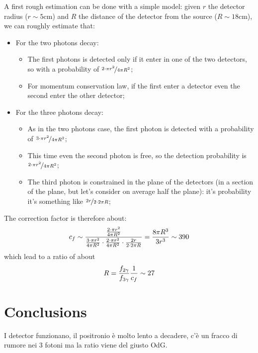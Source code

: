 \documentclass[11pt,a4 paper]{article}
\let\oldfrac\frac
\renewcommand{\frac}[3][d]{\ifthenelse{\equal{#1}{d}}{\oldfrac{#2}{#3}}{\nicefrac{#2}{#3}}}
\begin{document}
A first rough estimation can be done with a simple model: given $r$ the detector radius ($r\sim5\si{\centi\meter}$) and $R$ the distance of the detector from the source ($R\sim18\si{\centi\meter}$), we can roughly estimate that:
\begin{itemize}
    \item For the two photons decay:
    \begin{itemize}
        \item The first photons is detected only if it enter in one of the two detectors, so with a probability of $\frac[f]{2\cdot \pi r^2}{4\pi R^2}$;
        \item For momentum conservation law, if the first enter a detector even the second enter the other detector;
    \end{itemize}
    \item For the three photons decay:
    \begin{itemize}
        \item As in the two photons case, the first photon is detected with a probability of $\frac[f]{3\cdot \pi r^2}{4\pi R^2}$;
        \item This time even the second photon is free, so the detection probability is $\frac[f]{2\cdot \pi r^2}{4\pi R^2}$;
        \item The third photon is constrained in the plane of the detectors (in a section of the plane, but let's consider on average half the plane): it's probability it's something like  $\frac[f]{2r}{2\cdot2\pi R}$;
    \end{itemize}
\end{itemize}
The correction factor is therefore about:
    \begin{equation}
        c_f \sim \frac{\frac{2\cdot \pi r^2}{4\pi R^2}}{\frac{3\cdot \pi r^2}{4\pi R^2}\cdot\frac{2\cdot \pi r^2}{4\pi R^2}\cdot \frac{2r}{2\cdot2\pi R}} = \frac{8\pi R^3}{3r^3} \sim 390
    \end{equation}
which lead to a ratio of about
\begin{equation}
    R = \frac{f_{2\gamma}}{f_{3\gamma}} \frac{1}{c_f} \sim 27
\end{equation}



\section{Conclusions}
I detector funzionano, il positronio è molto lento a decadere, c'è un fracco di rumore nei 3 fotoni ma la ratio viene del giusto OdG.
\end{document}
